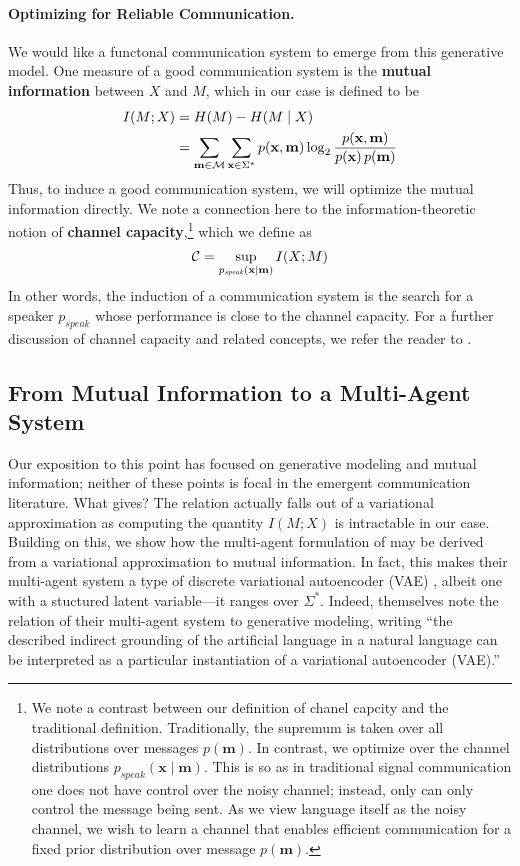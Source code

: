 \documentclass[11pt,a4paper]{article}
\newcommand{\xx}{\mathbf{x}}
\newcommand{\mm}{\mathbf{m}}
\newcommand{\pspeak}{p_{\textit{speak}}}
\newcommand{\defn}[1]{\textbf{#1}}
\newcommand{\calM}{{\cal M}}
\newcommand{\calC}{{\cal C}}
\begin{document}
\paragraph{Optimizing for Reliable Communication.}
We would like a functonal communication system to emerge from this generative model. One measure of a good communication system is the \defn{mutual information} between $X$ and $M$, which in our case
is defined to be
\begin{align}
I(M; X) &= H(M) - H(M \mid X) \\
        &=\sum_{\mm \in \calM} \sum_{\xx \in \Sigma^*}p(\xx, \mm) \log_2 \frac{p(\xx, \mm)}{p(\xx) \, p(\mm)} \nonumber 
\end{align}
Thus, to induce a good communication system, we will optimize the mutual information directly. We note a connection here to the information-theoretic notion of \defn{channel capacity},\footnote{We note a contrast between our definition of chanel capcity and the traditional definition. Traditionally, the supremum is taken over all distributions over messages $p(\mm)$. In contrast, we optimize over the channel distributions $\pspeak(\xx \mid \mm)$. This is so as in traditional signal communication one does not have control over the noisy channel; instead, only can only control the message being sent. As we view language itself as the noisy channel, we wish to learn a channel that enables efficient communication for a fixed prior distribution over message $p(\mm)$.}
which we define as
\begin{equation}
    \calC = \sup_{\pspeak(\xx \mid \mm)} I(X; M)
\end{equation}
In other words, the induction of a communication system is the search for a speaker $\pspeak$ whose performance is close to the channel capacity. For a further discussion of channel capacity and related concepts, we refer the reader to .

\subsection{From Mutual Information to a Multi-Agent System}\label{sec:agents}
Our exposition to this point has focused on generative modeling
and mutual information; neither of these points is focal in the 
emergent communication literature. What gives? The relation actually falls out of a variational approximation as computing the quantity $I(M; X)$ is intractable in our case. Building on this, we show how the multi-agent formulation of  may be derived from a variational approximation to mutual information. In fact, this makes their multi-agent system a type of discrete variational autoencoder (VAE) \cite{kingma2013auto}, albeit one with a stuctured latent variable---it ranges over $\Sigma^*$. Indeed,  themselves note the relation of their multi-agent system to generative
modeling, writing ``the described indirect grounding of the artificial language in a natural language can be interpreted as
a particular instantiation of a variational autoencoder (VAE).''
\end{document}
